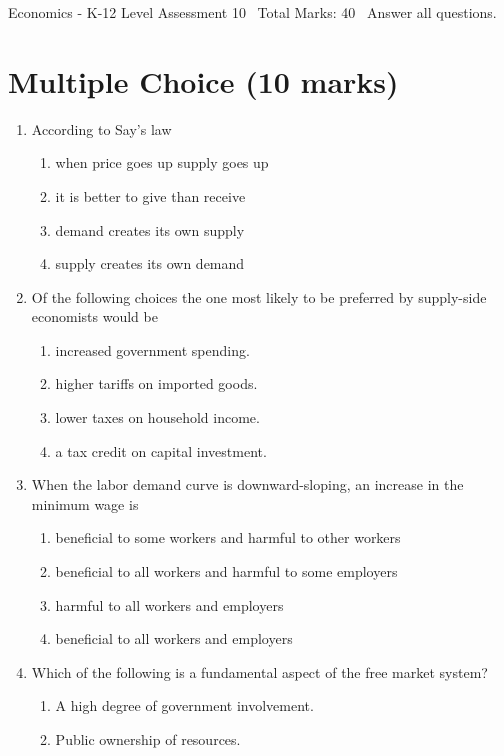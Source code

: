 \documentclass[12pt]{article}
\begin{document}
\begin{center}
Economics - K-12 Level Assessment 10 \
Total Marks: 40 \
Answer all questions.
\end{center}

\section*{Multiple Choice (10 marks)}
\begin{enumerate}[label=\arabic*.]
\item According to Say's law
\begin{enumerate}[label=(\alph*)]
    \item when price goes up supply goes up
    \item it is better to give than receive
    \item demand creates its own supply
    \item supply creates its own demand
\end{enumerate}
\item Of the following choices the one most likely to be preferred by supply-side economists would be
\begin{enumerate}[label=(\alph*)]
    \item increased government spending.
    \item higher tariffs on imported goods.
    \item lower taxes on household income.
    \item a tax credit on capital investment.
\end{enumerate}
\item When the labor demand curve is downward-sloping, an increase in the minimum wage is
\begin{enumerate}[label=(\alph*)]
    \item beneficial to some workers and harmful to other workers
    \item beneficial to all workers and harmful to some employers
    \item harmful to all workers and employers
    \item beneficial to all workers and employers
\end{enumerate}
\item Which of the following is a fundamental aspect of the free market system?
\begin{enumerate}[label=(\alph*)]
    \item A high degree of government involvement.
    \item Public ownership of resources.

\end{enumerate}
\end{enumerate}
\end{document}
